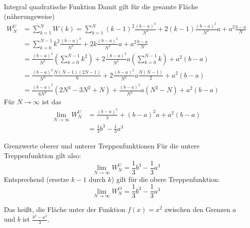\begin{frame}{Integral quadratische Funktion}
\small{	Damit gilt für die gesamte Fläche (näherungsweise)
	\begin{align*}
		W_{N}^{U} & = \sum_{k=1}^{N} W(k) = \sum_{k=1}^{N} (k-1)^2 \frac{(b-a)^3}{N^3} + 2(k-1)\frac{(b-a)^2}{N^2}a + a^2 \frac{b-a}{N} \\
		&  = \sum_{k=0}^{N-1} k^2 \frac{(b-a)^3}{N^3} + 2k\frac{(b-a)^2}{N^2}a + a^2 \frac{b-a}{N} \\
		& = \frac{(b-a)^3}{N^3} \left( \sum_{k=0}^{N-1} k^2 \right)  + 2\frac{(b-a)^2}{N^2}a \left( \sum_{k=0}^{N-1} k \right) + a^2 (b-a) \\
		& = \frac{(b-a)^3}{N^3} \frac{N(N-1)(2N-1)}{6}  + 2\frac{(b-a)^2}{N^2}a \frac{N(N-1)}{2} + a^2 (b-a) \\
		& = \frac{(b-a)^3}{6N^3} \left( 2N^3 - 3N^2 + N \right) + \frac{(b-a)^2}{N^2} a (N^2 - N) +a^2 (b-a)
	\end{align*}
	Für $N \to \infty$ ist das
	\begin{align*}
		\lim_{N \to \infty} W_{N}^{U} & = \frac{(b-a)^3}{3} + (b-a)^2 a + a^2 (b-a) \\
		& = \frac{1}{3}b^3 - \frac{1}{3} a^3
  	\end{align*}}
\end{frame}

\begin{frame}{Grenzwerte oberer und unterer Treppenfunktionen}
	Für die untere Treppenfunktion gilt also:
	\[
		\lim_{N \to \infty} W_{N}^{U} = \frac{1}{3} b^3 - \frac{1}{3}a^3
	\]
	Entsprechend (ersetze $k-1$ durch $k$) gilt für die obere Treppenfunktion:
		\[
		\lim_{N \to \infty} W_{N}^{O} = \frac{1}{3} b^3 - \frac{1}{3}a^3
		\]
		
	Das heißt, die Fläche unter der Funktion $f(x)=x^2$ zwischen den Grenzen $a$ und $b$ ist $\frac{b^3 - a^3}{3}$.
\end{frame}

